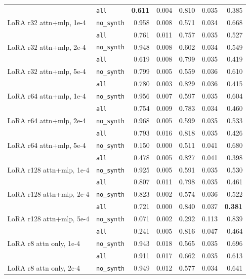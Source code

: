 \begin{longtable}{llrrrrr}
 & \texttt{all} & \textbf{0.611} & 0.004 & 0.810 & 0.035 & 0.385 \\
\addlinespace[2pt]
LoRA r32 attn+mlp, 1e-4 & \texttt{no\_synth} & 0.958 & 0.008 & 0.571 & 0.034 & 0.668 \\
 & \texttt{all} & 0.761 & 0.011 & 0.757 & 0.035 & 0.527 \\
\addlinespace[2pt]
LoRA r32 attn+mlp, 2e-4 & \texttt{no\_synth} & 0.948 & 0.008 & 0.602 & 0.034 & 0.549 \\
 & \texttt{all} & 0.619 & 0.008 & 0.799 & 0.035 & 0.419 \\
\addlinespace[2pt]
LoRA r32 attn+mlp, 5e-4 & \texttt{no\_synth} & 0.799 & 0.005 & 0.559 & 0.036 & 0.610 \\
 & \texttt{all} & 0.780 & 0.003 & 0.829 & 0.036 & 0.415 \\
\addlinespace[2pt]
LoRA r64 attn+mlp, 1e-4 & \texttt{no\_synth} & 0.956 & 0.007 & 0.597 & 0.035 & 0.604 \\
 & \texttt{all} & 0.754 & 0.009 & 0.783 & 0.034 & 0.460 \\
\addlinespace[2pt]
LoRA r64 attn+mlp, 2e-4 & \texttt{no\_synth} & 0.968 & 0.005 & 0.599 & 0.035 & 0.533 \\
 & \texttt{all} & 0.793 & 0.016 & 0.818 & 0.035 & 0.426 \\
\addlinespace[2pt]
LoRA r64 attn+mlp, 5e-4 & \texttt{no\_synth} & 0.150 & 0.000 & 0.511 & 0.041 & 0.680 \\
 & \texttt{all} & 0.478 & 0.005 & 0.827 & 0.041 & 0.398 \\
\addlinespace[2pt]
LoRA r128 attn+mlp, 1e-4 & \texttt{no\_synth} & 0.925 & 0.005 & 0.591 & 0.035 & 0.530 \\
 & \texttt{all} & 0.807 & 0.011 & 0.798 & 0.035 & 0.461 \\
\addlinespace[2pt]
LoRA r128 attn+mlp, 2e-4 & \texttt{no\_synth} & 0.823 & 0.002 & 0.574 & 0.036 & 0.522 \\
 & \texttt{all} & 0.721 & 0.000 & 0.840 & 0.037 & \textbf{0.381} \\
\addlinespace[2pt]
LoRA r128 attn+mlp, 5e-4 & \texttt{no\_synth} & 0.071 & 0.002 & 0.292 & 0.113 & 0.839 \\
 & \texttt{all} & 0.241 & 0.005 & 0.816 & 0.047 & 0.464 \\
\addlinespace[2pt]
LoRA r8 attn only, 1e-4 & \texttt{no\_synth} & 0.943 & 0.018 & 0.565 & 0.035 & 0.696 \\
 & \texttt{all} & 0.911 & 0.017 & 0.662 & 0.035 & 0.613 \\
\addlinespace[2pt]
LoRA r8 attn only, 2e-4 & \texttt{no\_synth} & 0.949 & 0.012 & 0.577 & 0.034 & 0.641 \\

\end{longtable}
